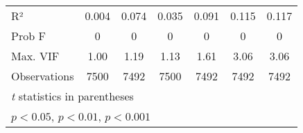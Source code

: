 \documentclass{article}
\begin{document}
\begin{table}[htbp]
\begin{tabular}{l*{6}{c}}
\hline
R²                  &        0.004         &         0.074          &       0.035       &         0.091        &         0.115       &       0.117          \\
Prob  F            &        0        &         0       &       0     &         0        &         0       &       0          \\
Max. VIF           &        1.00        &         1.19       &       1.13     &         1.61        &         3.06       &       3.06          \\
\hline
Observations        &        7500         &        7492         &        7500         &        7492         &        7492         &        7492         \\
\hline\hline
\multicolumn{7}{l}{\footnotesize \textit{t} statistics in parentheses}\\
\multicolumn{7}{l}{\footnotesize \sym{*} \(p<0.05\), \sym{**} \(p<0.01\), \sym{***} \(p<0.001\)}\\
\end{tabular}
\end{table}
\end{document}
